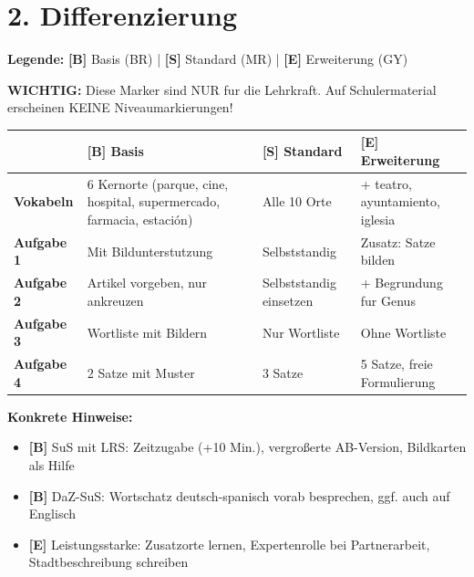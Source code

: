 \documentclass[11pt, a4paper]{article}
\newcommand{\B}{\textcolor{basis}{\textbf{[B]}}}
\newcommand{\Std}{\textcolor{standard}{\textbf{[S]}}}
\newcommand{\E}{\textcolor{erweiterung}{\textbf{[E]}}}
\begin{document}

\section*{2. Differenzierung}

\begin{differenzierung}
\textbf{Legende:} \B{} Basis (BR) | \Std{} Standard (MR) | \E{} Erweiterung (GY)

\vspace{0.5em}

\textbf{WICHTIG:} Diese Marker sind NUR fur die Lehrkraft. Auf Schulermaterial erscheinen KEINE Niveaumarkierungen!
\end{differenzierung}

\vspace{1em}

\begin{tabularx}{\textwidth}{|l|X|X|X|}
\hline
& \B{} \textbf{Basis} & \Std{} \textbf{Standard} & \E{} \textbf{Erweiterung} \\
\hline
\textbf{Vokabeln} & 6 Kernorte (parque, cine, hospital, supermercado, farmacia, estación) & Alle 10 Orte & + teatro, ayuntamiento, iglesia \\
\hline
\textbf{Aufgabe 1} & Mit Bildunterstutzung & Selbststandig & Zusatz: Satze bilden \\
\hline
\textbf{Aufgabe 2} & Artikel vorgeben, nur ankreuzen & Selbststandig einsetzen & + Begrundung fur Genus \\
\hline
\textbf{Aufgabe 3} & Wortliste mit Bildern & Nur Wortliste & Ohne Wortliste \\
\hline
\textbf{Aufgabe 4} & 2 Satze mit Muster & 3 Satze & 5 Satze, freie Formulierung \\
\hline
\end{tabularx}

\vspace{1em}

\textbf{Konkrete Hinweise:}
\begin{itemize}
    \item \B{} SuS mit LRS: Zeitzugabe (+10 Min.), vergroßerte AB-Version, Bildkarten als Hilfe
    \item \B{} DaZ-SuS: Wortschatz deutsch-spanisch vorab besprechen, ggf. auch auf Englisch
    \item \E{} Leistungsstarke: Zusatzorte lernen, Expertenrolle bei Partnerarbeit, Stadtbeschreibung schreiben
\end{itemize}
\end{document}
